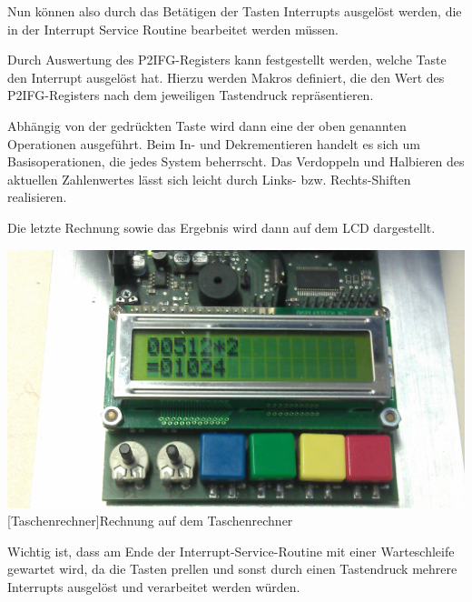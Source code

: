\documentclass[12pt,a4paper,bibliography=totocnumbered,listof=totocnumbered]{scrartcl}
\begin{document}
\vspace{1em}


Nun können also durch das Betätigen der Tasten Interrupts ausgelöst werden, die in der Interrupt Service Routine bearbeitet werden müssen.

Durch Auswertung des P2IFG-Registers kann festgestellt werden, welche Taste den Interrupt ausgelöst hat. Hierzu werden Makros definiert, die den Wert des P2IFG-Registers nach dem jeweiligen Tastendruck repräsentieren.

\vspace{1em}


\vspace{1em}


Abhängig von der gedrückten Taste wird dann eine der oben genannten Operationen ausgeführt. Beim In- und Dekrementieren handelt es sich um Basisoperationen, die jedes System beherrscht. Das Verdoppeln und Halbieren des aktuellen Zahlenwertes lässt sich leicht durch Links- bzw. Rechts-Shiften realisieren.

Die letzte Rechnung sowie das Ergebnis wird dann auf dem LCD dargestellt.

\vspace{1em}
\begin{minipage}{\linewidth}
	\centering
	\includegraphics[width=0.7\linewidth]{img/Taschenrechner.jpg}
	[Taschenrechner]{Rechnung auf dem Taschenrechner}
	\label{fig:Taschenrechner}
\end{minipage}

Wichtig ist, dass am Ende der Interrupt-Service-Routine mit einer Warteschleife gewartet wird, da die Tasten prellen und sonst durch einen Tastendruck mehrere Interrupts ausgelöst und verarbeitet werden würden.
\end{document}
